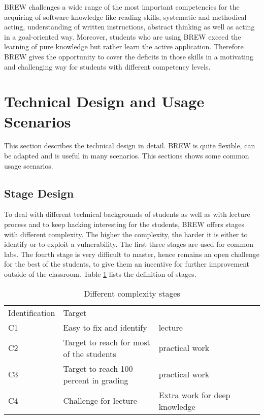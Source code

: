 \documentclass{llncs}
\begin{document}
BREW challenges a wide range of the most important competencies for the acquiring of software knowledge like reading skills, systematic and methodical acting, understanding of written instructions, abstract thinking as well as acting in a goal-oriented way.
Moreover, students who are using BREW exceed the learning of pure knowledge but rather learn the active application.
Therefore BREW gives the opportunity to cover the deficits in those skills in a motivating and challenging way for students with different competency levels.\\ 

\section{Technical Design and Usage Scenarios}\label{sec:tecdesign}
This section describes the technical design in detail. BREW is quite flexible, can be adapted and is useful in many scenarios. This sections shows some common usage scenarios.

\subsection{Stage Design}\label{subsec:stages}
To deal with different technical backgrounds of students as well as with lecture process and to keep hacking interesting for the students, BREW offers stages with different complexity. The higher the complexity, the harder it is either to identify or to exploit a vulnerability. The first three stages are used for common labs. The fourth stage is very difficult to master, hence remains an open challenge for the best of the students, to give them an incentive for further improvement outside of the classroom. Table \ref{tab:complexity} lists the definition of stages.

\begin{table}
\centering
\caption{Different complexity stages}
\label{tab:complexity}
\begin{tabular}{llllll}
\hline\noalign{\smallskip}
Identification & Target\\
\noalign{\smallskip}
\hline
\noalign{\smallskip}
C1 & Easy to fix and identify & lecture\\
C2 & Target to reach for most of the students & practical work\\
C3 & Target to reach 100 percent in grading & practical work\\
C4 & Challenge for lecture & Extra work for deep knowledge\\
\hline
\end{tabular}
\end{table}
\end{document}
